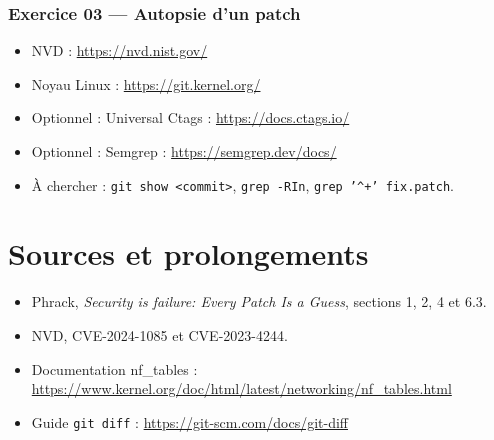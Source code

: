 \documentclass{training}
\begin{document}
\subsection*{Exercice 03 --- Autopsie d'un patch}
\begin{itemize}
  \item NVD : \url{https://nvd.nist.gov/}
  \item Noyau Linux : \url{https://git.kernel.org/}
  \item Optionnel : Universal Ctags : \url{https://docs.ctags.io/}
  \item Optionnel : Semgrep : \url{https://semgrep.dev/docs/}
  \item À chercher : \texttt{git show <commit>}, \texttt{grep -RIn},
        \texttt{grep '\string^+' fix.patch}.
\end{itemize}

\chapter{Sources et prolongements}
\begin{itemize}
  \item Phrack, \emph{Security is failure: Every Patch Is a Guess},
        sections 1, 2, 4 et 6.3.
  \item NVD, CVE-2024-1085 et CVE-2023-4244.
  \item Documentation nf\_tables :
        \url{https://www.kernel.org/doc/html/latest/networking/nf_tables.html}
  \item Guide \texttt{git diff} :
        \url{https://git-scm.com/docs/git-diff}
\end{itemize}

\end{document}
